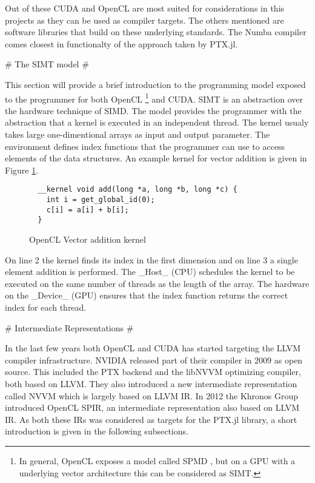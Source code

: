 \begin{markdown}
Out of these \gls{CUDA} and \gls{OpenCL} are most suited for
considerations in this projects as they can be used as compiler
targets. The others mentioned are software libraries that build on
these underlying standards. The Numba compiler comes closest in
functionalty of the approach taken by PTX.jl.

# The SIMT model #

This section will provide a brief introduction to the programming
model exposed to the programmer for both OpenCL \footnote{In general,
  OpenCL exposes a model called \gls{SPMD} \cite{opencl}, but on a GPU
  with a underlying vector architecture this can be considered as
  SIMT.}  and CUDA. \gls{SIMT} is an abstraction over the hardware
technique of \gls{SIMD}. The model provides the programmer with the
abstraction that a kernel is executed in an independent thread. The
kernel usualy takes large one-dimentional arrays as input and output
parameter. The environment defines index functions that the programmer
can use to access elements of the data structures. An example kernel
for vector addition is given in Figure \ref{smit:add}.

\begin{figure}[H]
  \begin{verbatim}
  __kernel void add(long *a, long *b, long *c) {
    int i = get_global_id(0);
    c[i] = a[i] + b[i];
  }
  \end{verbatim}
  \caption{OpenCL Vector addition kernel}
  \label{smit:add}
\end{figure}

On line 2 the kernel finds its index in the first dimension and on
line 3 a single element addition is performed. The _Host_ (\gls{CPU})
schedules the kernel to be executed on the same number of threads as
the length of the array. The hardware on the _Device_ (\gls{GPU})
ensures that the index function returns the correct index for each
thread.

# Intermediate Representations #

In the last few years both \gls{OpenCL} and \gls{CUDA} has started
targeting the \gls{LLVM} compiler infrastructure. NVIDIA released part
of their compiler in 2009 as open source. This included the \gls{PTX}
backend \cite{nvptx} and the libNVVM \cite{libnvvm} optimizing
compiler, both based on \gls{LLVM}. They also introduced a new
intermediate representation called \gls{NVVM} which is largely based
on \gls{LLVM} \gls{IR}. In 2012 the Khronos Group introduced
\gls{OpenCL} \gls{SPIR}, an intermediate representation also based on
\gls{LLVM} \gls{IR}. As both these \glspl{IR} was considered as
targets for the PTX.jl library, a short introduction is given in the
following subsections.


\end{markdown}
